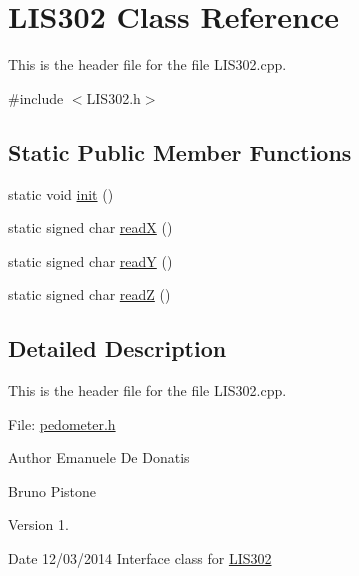\hypertarget{classLIS302}{\section{L\+I\+S302 Class Reference}
\label{classLIS302}
}


This is the header file for the file L\+I\+S302.\+cpp.  




{\ttfamily \#include $<$L\+I\+S302.\+h$>$}

\subsection*{Static Public Member Functions}
\begin{DoxyCompactItemize}
\item 
static void \hyperlink{classLIS302_ae17e47022db9b40e9254c689448e855c}{init} ()
\item 
static signed char \hyperlink{classLIS302_afdf8ad38d5be4bb65e032a6a27a4139a}{read\+X} ()
\item 
static signed char \hyperlink{classLIS302_a4300acbaf49847ce8fec1a2e068d4cca}{read\+Y} ()
\item 
static signed char \hyperlink{classLIS302_ab3f757b4247eb59d3d2f0d756ade6e91}{read\+Z} ()
\end{DoxyCompactItemize}


\subsection{Detailed Description}
This is the header file for the file L\+I\+S302.\+cpp. 

File\+: \hyperlink{pedometer_8h_source}{pedometer.\+h} \begin{DoxyAuthor}{Author}
Emanuele De Donatis 

Bruno Pistone 
\end{DoxyAuthor}
\begin{DoxyVersion}{Version}
1. 
\end{DoxyVersion}
\begin{DoxyDate}{Date}
12/03/2014 Interface class for \hyperlink{classLIS302}{L\+I\+S302} 
\end{DoxyDate}


